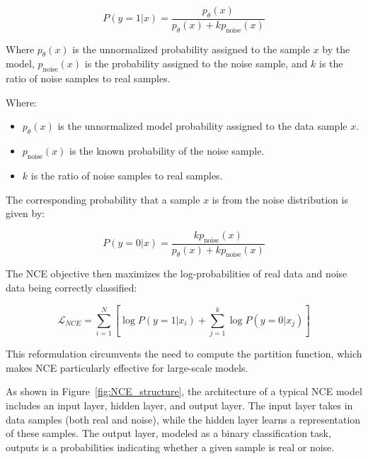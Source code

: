 \begin{equation}
P(y = 1 | x) = \frac{p_{\theta}(x)}{p_{\theta}(x) + k p_{\text{noise}}(x)}
\end{equation}

Where \( p_{\theta}(x) \) is the unnormalized probability assigned to the sample \( x \) by the model, \( p_{\text{noise}}(x) \) is the probability assigned to the noise sample, and \( k \) is the ratio of noise samples to real samples.

Where:
\begin{itemize}
    \item \( p_{\theta}(x) \) is the unnormalized model probability assigned to the data sample \( x \).
    \item \( p_{\text{noise}}(x) \) is the known probability of the noise sample.
    \item \( k \) is the ratio of noise samples to real samples.
\end{itemize}

The corresponding probability that a sample \( x \) is from the noise distribution is given by:

\begin{equation}
P(y = 0 | x) = \frac{k p_{\text{noise}}(x)}{p_{\theta}(x) + k p_{\text{noise}}(x)}
\end{equation}

The NCE objective then maximizes the log-probabilities of real data and noise data being correctly classified:

\begin{equation}
\mathcal{L}_{NCE} = \sum_{i=1}^{N} \left[ \log P(y=1 | x_i) + \sum_{j=1}^{k} \log P(y=0 | x_j) \right]
\end{equation}

This reformulation circumvents the need to compute the partition function, which makes NCE particularly effective for large-scale models.

As shown in Figure~\ref{fig:NCE_structure}, the architecture of a typical NCE model includes an input layer, hidden layer, and output layer. The input layer takes in data samples (both real and noise), while the hidden layer learns a representation of these samples. The output layer, modeled as a binary classification task, outputs is a probabilities indicating whether a given sample is real or noise.

